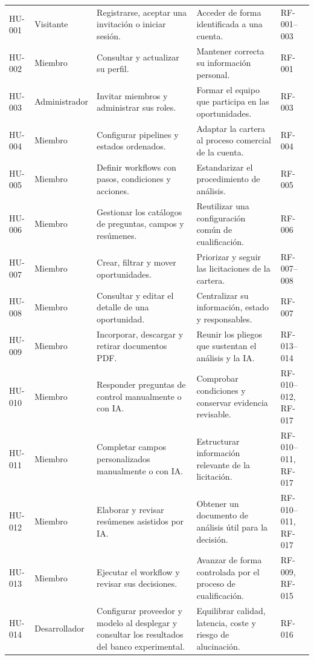 \begin{longtable}{L{1.1cm} L{2.05cm} L{4.05cm} L{4.05cm} L{1.15cm}}
  HU-001 & Visitante & Registrarse, aceptar una invitación o iniciar sesión. &
    Acceder de forma identificada a una cuenta. & RF-001--003 \\
  HU-002 & Miembro & Consultar y actualizar su perfil. & Mantener correcta su
    información personal. & RF-001 \\
  HU-003 & Administrador & Invitar miembros y administrar sus roles. & Formar el
    equipo que participa en las oportunidades. & RF-003 \\
  HU-004 & Miembro & Configurar pipelines y estados ordenados. & Adaptar la
    cartera al proceso comercial de la cuenta. & RF-004 \\
  HU-005 & Miembro & Definir workflows con pasos, condiciones y acciones. &
    Estandarizar el procedimiento de análisis. & RF-005 \\
  HU-006 & Miembro & Gestionar los catálogos de preguntas, campos y resúmenes. &
    Reutilizar una configuración común de cualificación. & RF-006 \\
  HU-007 & Miembro & Crear, filtrar y mover oportunidades. & Priorizar y seguir
    las licitaciones de la cartera. & RF-007--008 \\
  HU-008 & Miembro & Consultar y editar el detalle de una oportunidad. &
    Centralizar su información, estado y responsables. & RF-007 \\
  HU-009 & Miembro & Incorporar, descargar y retirar documentos PDF. & Reunir
    los pliegos que sustentan el análisis y la IA. & RF-013--014 \\
  HU-010 & Miembro & Responder preguntas de control manualmente o con IA. &
    Comprobar condiciones y conservar evidencia revisable. & RF-010--012,
    RF-017 \\
  HU-011 & Miembro & Completar campos personalizados manualmente o con IA. &
    Estructurar información relevante de la licitación. & RF-010--011,
    RF-017 \\
  HU-012 & Miembro & Elaborar y revisar resúmenes asistidos por IA. & Obtener un
    documento de análisis útil para la decisión. & RF-010--011, RF-017 \\
  HU-013 & Miembro & Ejecutar el workflow y revisar sus decisiones. & Avanzar de
    forma controlada por el proceso de cualificación. & RF-009, RF-015 \\
  HU-014 & Desarrollador & Configurar proveedor y modelo al desplegar y
    consultar los resultados del banco experimental. & Equilibrar calidad,
    latencia, coste y riesgo de alucinación. & RF-016 \\
\end{longtable}
\normalsize

